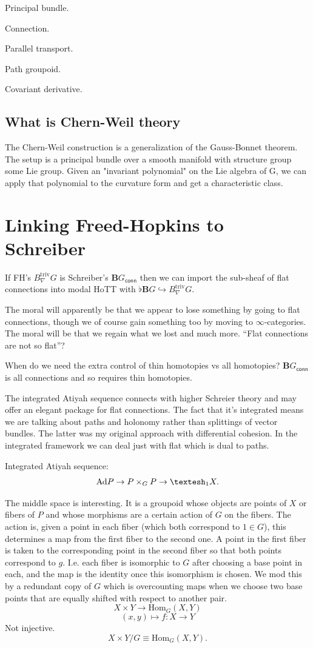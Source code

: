 \documentclass[12pt]{article}
\newcommand{\Hom}{\mathrm{Hom}}
\newcommand{\shape}{\ensuremath{\text{\textesh}}}
\newcommand{\bg}{\ensuremath{\textbf{B}G}}
\newcommand{\bgconn}{\ensuremath{\textbf{B}G_{\textsf{conn}}}}
\begin{document}
Principal bundle.

Connection.

Parallel transport.

Path groupoid.

Covariant derivative.




\subsection{What is Chern-Weil theory}
The Chern-Weil construction is a generalization of the Gauss-Bonnet theorem. The setup is a principal bundle over a smooth manifold with structure group some Lie group. Given an "invariant polynomial" on the Lie algebra of G, we can apply that polynomial to the curvature form and get a characteristic class.

\section{Linking Freed-Hopkins to Schreiber}
If FH's $B_{\nabla}^{\mathrm{triv}}G$ is Schreiber's $\bgconn$ then we can import the sub-sheaf of flat connections into modal HoTT with $\flat\bg\hookrightarrow B_{\nabla}^{\mathrm{triv}}G$.

The moral will apparently be that we appear to lose something by going to flat connections, though we of course gain something too by moving to $\infty$-categories. The moral will be that we regain what we lost and much more. ``Flat connections are not so flat''?

When do we need the extra control of thin homotopies vs all homotopies? $\bgconn$ is all connections and so requires thin homotopies.

The integrated Atiyah sequence connects with higher Schreier theory and may offer an elegant package for flat connections. The fact that it's integrated means we are talking about paths and holonomy rather than splittings of vector bundles. The latter was my original approach with differential cohesion. In the integrated framework we can deal just with flat which is dual to paths.

Integrated Atiyah sequence: \[ \mathrm{Ad}P \to P\times_GP \to \shape_1X.\]

The middle space is interesting. It is a groupoid whose objects are points of $X$ or fibers of $P$ and whose morphisms are a certain action of $G$ on the fibers. The action is, given a point in each fiber (which both correspond to $1\in G$), this determines a map from the first fiber to the second one. A point in the first fiber is taken to the corresponding point in the second fiber so that both points correspond to $g$. I.e. each fiber is isomorphic to $G$ after choosing a base point in each, and the map is the identity once this isomorphism is chosen. We mod this by a redundant copy of $G$ which is overcounting maps when we choose two base points that are equally shifted with respect to another pair. \[X\times Y \to \Hom_G(X, Y)\] \[(x, y) \mapsto f: X \to Y\] Not injective. \[ X\times Y / G \equiv \Hom_G(X, Y).\]
\end{document}
